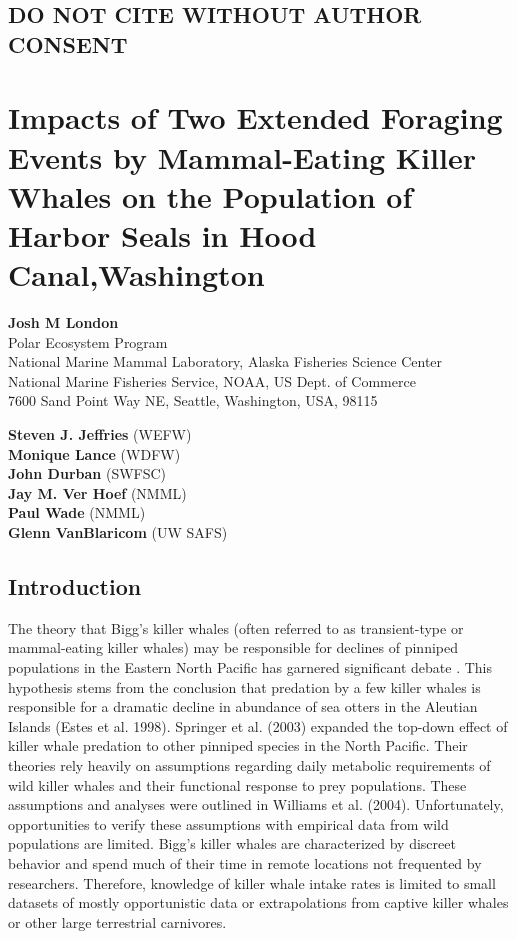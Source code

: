 \subsection{DO NOT CITE WITHOUT AUTHOR
CONSENT}\label{do-not-cite-without-author-consent}

\section{Impacts of Two Extended Foraging Events by Mammal-Eating Killer
Whales on the Population of Harbor Seals in Hood
Canal,Washington}\label{impacts-of-two-extended-foraging-events-by-mammal-eating-killer-whales-on-the-population-of-harbor-seals-in-hood-canalwashington}

\textbf{Josh M London}\\Polar Ecosystem Program\\National Marine Mammal
Laboratory, Alaska Fisheries Science Center\\National Marine Fisheries
Service, NOAA, US Dept. of Commerce\\7600 Sand Point Way NE, Seattle,
Washington, USA, 98115

\textbf{Steven J. Jeffries} (WEFW)\\\textbf{Monique Lance}
(WDFW)\\\textbf{John Durban} (SWFSC)\\\textbf{Jay M. Ver Hoef}
(NMML)\\\textbf{Paul Wade} (NMML)\\\textbf{Glenn VanBlaricom} (UW SAFS)

\subsection{Introduction}\label{introduction}

The theory that Bigg's killer whales (often referred to as
transient-type or mammal-eating killer whales) may be responsible for
declines of pinniped populations in the Eastern North Pacific has
garnered significant debate
\autocites{Springer2008}{Williams2004}{DeMaster2006}{Wade2007}. This
hypothesis stems from the conclusion that predation by a few killer
whales is responsible for a dramatic decline in abundance of sea otters
in the Aleutian Islands (Estes et al. 1998). Springer et al. (2003)
expanded the top-down effect of killer whale predation to other pinniped
species in the North Pacific. Their theories rely heavily on assumptions
regarding daily metabolic requirements of wild killer whales and their
functional response to prey populations. These assumptions and analyses
were outlined in Williams et al. (2004). Unfortunately, opportunities to
verify these assumptions with empirical data from wild populations are
limited. Bigg's killer whales are characterized by discreet behavior and
spend much of their time in remote locations not frequented by
researchers. Therefore, knowledge of killer whale intake rates is
limited to small datasets of mostly opportunistic data or extrapolations
from captive killer whales or other large terrestrial carnivores.

